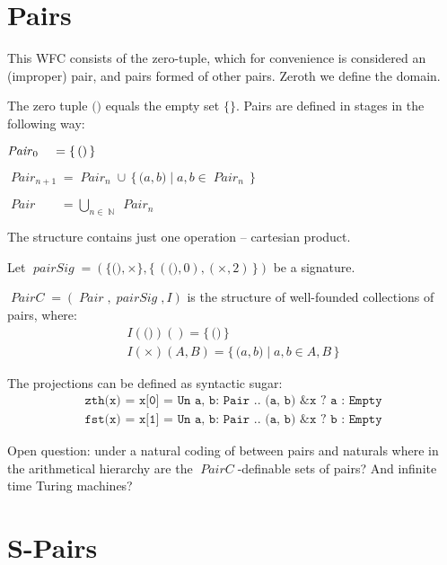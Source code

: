 \documentclass[oneside,12pt]{book}
\newcounter{question}
\theoremstyle{definition}
\theoremstyle{remark}
\newcommand\var[1]{\mathop{\mathit{#1}}\nolimits}
\newcommand{\Nat}{\var{\mathbb{N}}}
\newcommand{\Pair}{\var{Pair}}
\newcommand{\pair}[2]{{(}#1, #2{)}}
\newcommand{\pairZ}{{(}{)}}
\newcommand{\PairC}{\var{PairC}}
\begin{document}
\section{Pairs}

This WFC consists of the zero-tuple, which for convenience is considered
an (improper) pair, and pairs formed of other pairs.
Zeroth we define the domain.

\begin{defBox}
  The zero tuple $\pairZ$ equals the empty set $\{\}$. Pairs are defined in stages
  in the following way:
  
  \medskip \noindent
  $\Pair_{\mathrlap{0}\phantom{n+1}}     = \{\,\pairZ\,\}$
  
  \noindent \nopagebreak
  $\Pair_{n+1} = \Pair_n \cup\,\{\, \pair{a}{b} \mid a, b \in \Pair_n \,\}$
  
  \noindent \nopagebreak
  $\displaystyle \Pair_{\phantom{n+1}} = \bigcup_{n \in \Nat} \Pair_n$
\end{defBox}

The structure contains just one operation -- cartesian product.

\begin{defBox}
  Let $\var{pairSig} = (\{ \pairZ, \times \},
    \{\,(\pairZ, 0), (\times, 2)\,\})$ be a signature.
  
  \medskip \noindent $\PairC = (\Pair, \var{pairSig}, I)$ is the structure
  of well-founded collections of pairs, where:
  \begin{gather*}
    I(\pairZ)() = \{\,\pairZ\,\} \\
    I(\times)(A, B) = \{\,\pair{a}{b} \mid a,b \in A,B\,\}
  \end{gather*}
\end{defBox}

The projections can be defined as syntactic sugar:
\begin{gather*}
  \texttt{zth(x) = x[0] = Un a, b: Pair .. \pair{a}{b} \& x ? a : Empty} \\
  \texttt{fst(x) = x[1] = Un a, b: Pair .. \pair{a}{b} \& x ? b : Empty}
\end{gather*}

Open question: under a natural coding of between pairs and naturals
where in the arithmetical hierarchy are the $\PairC$-definable sets of pairs?
And infinite time Turing machines?

\section{S-Pairs}
\end{document}
